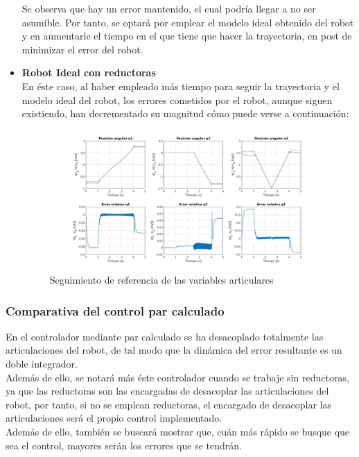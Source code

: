 \begin{itemize}
Se observa que hay un error mantenido, el cual podría llegar a no ser asumible. Por tanto, se optará por emplear el modelo ideal obtenido del robot y en aumentarle el tiempo en el que tiene que hacer la trayectoria, en post de minimizar el error del robot.


	\item \textbf{Robot Ideal con reductoras} \\
En éste caso, al haber empleado más tiempo para seguir la trayectoria y el modelo ideal del robot, los errores cometidos por el robot, aunque siguen existiendo, han decrementado su magnitud cómo puede verse a continuación:

\begin{figure}[h!]
	\centering
	\includegraphics[width=.8\textwidth]{exp3_posPDidealCR_circular_lento}
	\caption{Seguimiento de referencia de las variables articulares}
\end{figure}

\end{itemize}

\newpage
\subsubsection{Comparativa del control par calculado}
En el controlador mediante par calculado se ha desacoplado totalmente las articulaciones del robot, de tal modo que la dinámica del error resultante es un doble integrador. \\
Además de ello, se notará más éste controlador cuando se trabaje sin reductoras, ya que las reductoras son las encargadas de desacoplar las articulaciones del robot, por tanto, si no se emplean reductoras, el encargado de desacoplar las articulaciones será el propio control implementado. \\
Además de ello, también se buscará mostrar que, cuán más rápido se busque que sea el control, mayores serán los errores que se tendrán.\\

